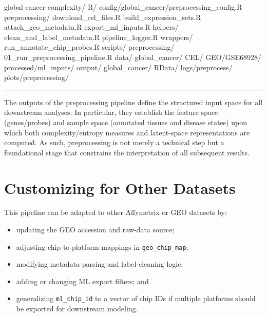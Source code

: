 \documentclass[
  letterpaper,
  DIV=11,
  numbers=noendperiod,
  openany,
  oneside]{scrreprt}
\newenvironment{Shaded}{\begin{snugshade}}{\end{snugshade}}
\newcommand{\NormalTok}[1]{\textcolor[rgb]{0.00,0.23,0.31}{#1}}
\providecommand{\tightlist}{%
  \setlength{\itemsep}{0pt}\setlength{\parskip}{0pt}}
\begin{document}
\begin{Shaded}
\begin{Highlighting}[]
\NormalTok{global{-}cancer{-}complexity/}
\NormalTok{  R/}
\NormalTok{    config/global\_cancer/preprocessing\_config.R}
\NormalTok{    preprocessing/}
\NormalTok{      download\_cel\_files.R}
\NormalTok{      build\_expression\_sets.R}
\NormalTok{      attach\_geo\_metadata.R}
\NormalTok{      export\_ml\_inputs.R}
\NormalTok{    helpers/}
\NormalTok{      clean\_and\_label\_metadata.R}
\NormalTok{      pipeline\_logger.R}
\NormalTok{    wrappers/}
\NormalTok{      run\_annotate\_chip\_probes.R}
\NormalTok{  scripts/}
\NormalTok{    preprocessing/}
\NormalTok{      01\_run\_preprocessing\_pipeline.R}
\NormalTok{  data/}
\NormalTok{    global\_cancer/}
\NormalTok{      CEL/}
\NormalTok{      GEO/GSE68928/}
\NormalTok{      processed/ml\_inputs/}
\NormalTok{  output/}
\NormalTok{    global\_cancer/}
\NormalTok{      RData/}
\NormalTok{      logs/preprocess/}
\NormalTok{      plots/preprocessing/}
\end{Highlighting}
\end{Shaded}

\begin{center}\rule{0.5\linewidth}{0.5pt}\end{center}

The outputs of the preprocessing pipeline define the structured input
space for all downstream analyses. In particular, they establish the
feature space (genes/probes) and sample space (annotated tissues and
disease states) upon which both complexity/entropy measures and
latent-space representations are computed. As such, preprocessing is not
merely a technical step but a foundational stage that constrains the
interpretation of all subsequent results.

\section*{Customizing for Other
Datasets}\label{customizing-for-other-datasets}


This pipeline can be adapted to other Affymetrix or GEO datasets by:

\begin{itemize}
\tightlist
\item
  updating the GEO accession and raw-data source;
\item
  adjusting chip-to-platform mappings in \texttt{geo\_chip\_map};
\item
  modifying metadata parsing and label-cleaning logic;
\item
  adding or changing ML export filters; and
\item
  generalizing \texttt{ml\_chip\_id} to a vector of chip IDs if multiple
  platforms should be exported for downstream modeling.
\end{itemize}
\end{document}

